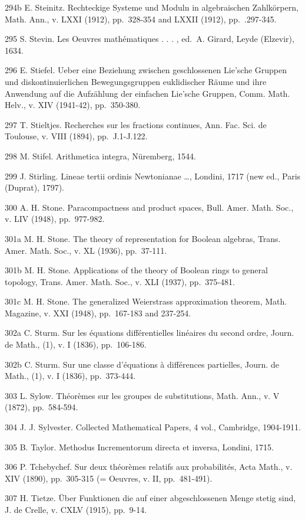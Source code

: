 294b E. Steinitz. Rechteckige Systeme und Moduln in algebraischen Zahlkörpern, Math. Ann., v. LXXI (1912), pp.~328-354 and LXXII (1912), pp.~.297-345.

295 S. Stevin. Les Oeuvres mathématiques . . . , ed.~A. Girard, Leyde (Elzevir), 1634.

296 E. Stiefel. Ueber eine Beziehung zwischen geschlossenen Lie'sche Gruppen und diskontinuierlichen Bewegungsgruppen euklidischer Räume und ihre Anwendung auf die Aufzählung der einfachen Lie'sche Gruppen, Comm. Math. Helv., v. XIV (1941-42), pp.~350-380.

297 T. Stieltjes. Recherches sur les fractions continues, Ann. Fac. Sci. de Toulouse, v. VIII (1894), pp.~J.1-J.122.

298 M. Stifel. Arithmetica integra, Nüremberg, 1544.

299 J. Stirling. Lineae tertii ordinis Newtonianae \ldots, Londini, 1717 (new ed., Paris (Duprat), 1797).

300 A. H. Stone. Paracompactness and product spaces, Bull. Amer. Math. Soc., v. LIV (1948), pp.~977-982.

301a M. H. Stone. The theory of representation for Boolean algebras, Trans. Amer. Math. Soc., v. XL (1936), pp.~37-111.

301b M. H. Stone. Applications of the theory of Boolean rings to general topology, Trans. Amer. Math. Soc., v. XLI (1937), pp.~375-481.

301c M. H. Stone. The generalized Weierstrass approximation theorem, Math. Magazine, v. XXI (1948), pp.~167-183 and 237-254.

302a C. Sturm. Sur les équations différentielles linéaires du second ordre, Journ. de Math., (1), v. I (1836), pp.~106-186.

302b C. Sturm. Sur une classe d'équations à différences partielles, Journ. de Math., (1), v. I (1836), pp.~373-444.

303 L. Sylow. Théorèmes sur les groupes de substitutions, Math. Ann., v. V (1872), pp.~584-594.

304 J. J. Sylvester. Collected Mathematical Papers, 4 vol., Cambridge, 1904-1911.

305 B. Taylor. Methodus Incrementorum directa et inversa, Londini, 1715.

306 P. Tchebychef. Sur deux théorèmes relatifs aux probabilités, Acta Math., v. XIV (1890), pp.~305-315 (= Oeuvres, v. II, pp.~481-491).

307 H. Tietze. Über Funktionen die auf einer abgeschlossenen Menge stetig sind, J. de Crelle, v. CXLV (1915), pp.~9-14.

